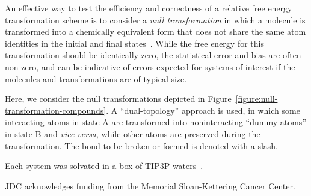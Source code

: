 \documentclass[aps,pre,twocolumn,superscriptaddress,nofootinbib]{revtex4-1}
\begin{document}
An effective way to test the efficiency and correctness of a relative free energy transformation scheme is to consider a \emph{null transformation} in which a molecule is transformed into a chemically equivalent form that does not share the same atom identities in the initial and final states~\cite{pitera-napthalene}.
While the free energy for this transformation should be identically zero, the statistical error and bias are often non-zero, and can be indicative of errors expected for systems of interest if the molecules and transformations are of typical size.

Here, we consider the null transformations depicted in Figure~\ref{figure:null-transformation-compounds}.
A ``dual-topology'' approach is used, in which some interacting atoms in state A are transformed into noninteracting ``dummy atoms'' in state B and \emph{vice versa}, while other atoms are preserved during the transformation.
The bond to be broken or formed is denoted with a slash.

Each system was solvated in a box of TIP3P waters~\cite{tip3p}.

\begin{acknowledgments}
JDC acknowledges funding from the Memorial Sloan-Kettering Cancer Center.
\end{acknowledgments}


\end{document}

